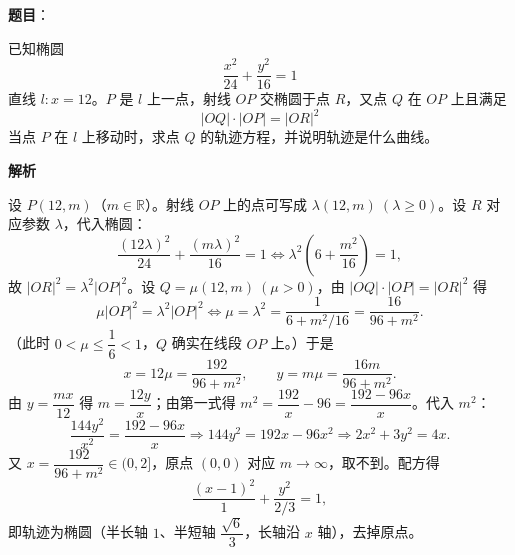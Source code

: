 \begin{answer}

\textbf{题目}：

已知椭圆
\nopagebreak[4]
\[
\frac{x^2}{24}+\frac{y^2}{16}=1
\]
直线 $l:x=12$。$P$ 是 $l$ 上一点，射线 $OP$ 交椭圆于点 $R$，又点 $Q$ 在 $OP$ 上且满足
\nopagebreak[4]
\[
|OQ|\cdot|OP|=|OR|^2
\]
当点 $P$ 在 $l$ 上移动时，求点 $Q$ 的轨迹方程，并说明轨迹是什么曲线。

\textbf{解析}

设 $P(12,m)$（$m\in\mathbb R$）。射线 $OP$ 上的点可写成 $\lambda(12,m)\ (\lambda\ge0)$。设 $R$ 对应参数 $\lambda$，代入椭圆：
\nopagebreak[4]
\[\frac{(12\lambda)^2}{24}+\frac{(m\lambda)^2}{16}=1\iff \lambda^2\left(6+\frac{m^2}{16}\right)=1,\]
故 $|OR|^2=\lambda^2|OP|^2$。设 $Q=\mu(12,m)\ (\mu>0)$，由 $|OQ|\cdot|OP|=|OR|^2$ 得
\nopagebreak[4]
\[\mu|OP|^2=\lambda^2|OP|^2\iff \mu=\lambda^2=\frac{1}{6+m^2/16}=\frac{16}{96+m^2}.\]
（此时 $0<\mu\le\dfrac16<1$，$Q$ 确实在线段 $OP$ 上。）于是
\nopagebreak[4]
\[x=12\mu=\frac{192}{96+m^2},\qquad y=m\mu=\frac{16m}{96+m^2}.\]
由 $y=\dfrac{mx}{12}$ 得 $m=\dfrac{12y}{x}$；由第一式得 $m^2=\dfrac{192}{x}-96=\dfrac{192-96x}{x}$。代入 $m^2$：
\nopagebreak[4]
\[\frac{144y^2}{x^2}=\frac{192-96x}{x}\Longrightarrow 144y^2=192x-96x^2\Longrightarrow 2x^2+3y^2=4x.\]
又 $x=\dfrac{192}{96+m^2}\in(0,2]$，原点 $(0,0)$ 对应 $m\to\infty$，取不到。配方得
\nopagebreak[4]
\[\frac{(x-1)^2}{1}+\frac{y^2}{2/3}=1,\]
即轨迹为椭圆（半长轴 $1$、半短轴 $\dfrac{\sqrt6}{3}$，长轴沿 $x$ 轴），去掉原点。


\end{answer}